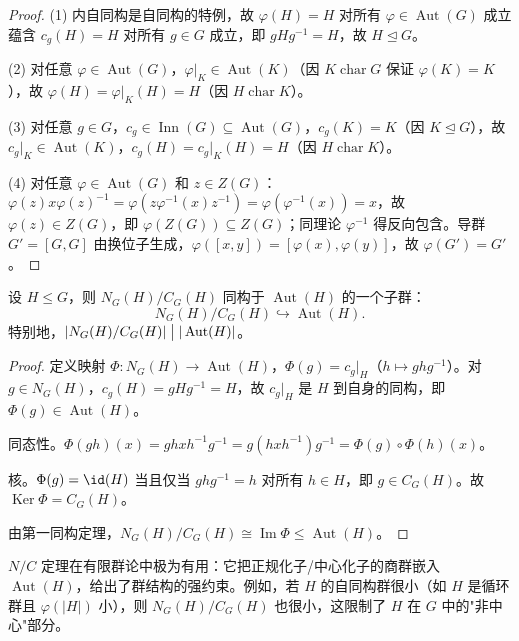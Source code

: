 \begin{proof}
(1) 内自同构是自同构的特例，故 $\varphi(H)=H$ 对所有 $\varphi\in\operatorname{Aut}(G)$ 成立蕴含 $c_g(H)=H$ 对所有 $g\in G$ 成立，即 $gHg^{-1}=H$，故 $H\mathrel{\trianglelefteq} G$。

(2) 对任意 $\varphi\in\operatorname{Aut}(G)$，$\varphi|_K\in\operatorname{Aut}(K)$（因 $K\operatorname{char}G$ 保证 $\varphi(K)=K$），故 $\varphi(H)=\varphi|_K(H)=H$（因 $H\operatorname{char}K$）。

(3) 对任意 $g\in G$，$c_g\in\operatorname{Inn}(G)\subseteq\operatorname{Aut}(G)$，$c_g(K)=K$（因 $K\mathrel{\trianglelefteq} G$），故 $c_g|_K\in\operatorname{Aut}(K)$，$c_g(H)=c_g|_K(H)=H$（因 $H\operatorname{char}K$）。

(4) 对任意 $\varphi\in\operatorname{Aut}(G)$ 和 $z\in Z(G)$：$\varphi(z)x\varphi(z)^{-1}=\varphi(z\varphi^{-1}(x)z^{-1})=\varphi(\varphi^{-1}(x))=x$，故 $\varphi(z)\in Z(G)$，即 $\varphi(Z(G))\subseteq Z(G)$；同理论 $\varphi^{-1}$ 得反向包含。导群 $G'=[G,G]$ 由换位子生成，$\varphi([x,y])=[\varphi(x),\varphi(y)]$，故 $\varphi(G')=G'$。
\end{proof}

\begin{theorem}[$N/C$ 定理]
\label{thm:nc-theorem}
设 $H\leqslant G$，则 $N_G(H)/C_G(H)$ 同构于 $\operatorname{Aut}(H)$ 的一个子群：
\[
N_G(H)/C_G(H)\hookrightarrow\operatorname{Aut}(H).
\]
特别地，$|N_G(H)/C_G(H)|\bigm||\operatorname{Aut}(H)|$。
\end{theorem}

\begin{proof}
定义映射 $\Phi:N_G(H)\to\operatorname{Aut}(H)$，$\Phi(g)=c_g|_H$（$h\mapsto ghg^{-1}$）。对 $g\in N_G(H)$，$c_g(H)=gHg^{-1}=H$，故 $c_g|_H$ 是 $H$ 到自身的同构，即 $\Phi(g)\in\operatorname{Aut}(H)$。

同态性。$\Phi(gh)(x)=ghxh^{-1}g^{-1}=g(hxh^{-1})g^{-1}=\Phi(g)\circ\Phi(h)(x)$。

核。$\Phi(g)=\id(H)$ 当且仅当 $ghg^{-1}=h$ 对所有 $h\in H$，即 $g\in C_G(H)$。故 $\operatorname{Ker}\Phi=C_G(H)$。

由第一同构定理，$N_G(H)/C_G(H)\cong\operatorname{Im}\Phi\leqslant\operatorname{Aut}(H)$。
\end{proof}

$N/C$ 定理在有限群论中极为有用：它把正规化子/中心化子的商群嵌入 $\operatorname{Aut}(H)$，给出了群结构的强约束。例如，若 $H$ 的自同构群很小（如 $H$ 是循环群且 $\varphi(|H|)$ 小），则 $N_G(H)/C_G(H)$ 也很小，这限制了 $H$ 在 $G$ 中的"非中心"部分。

